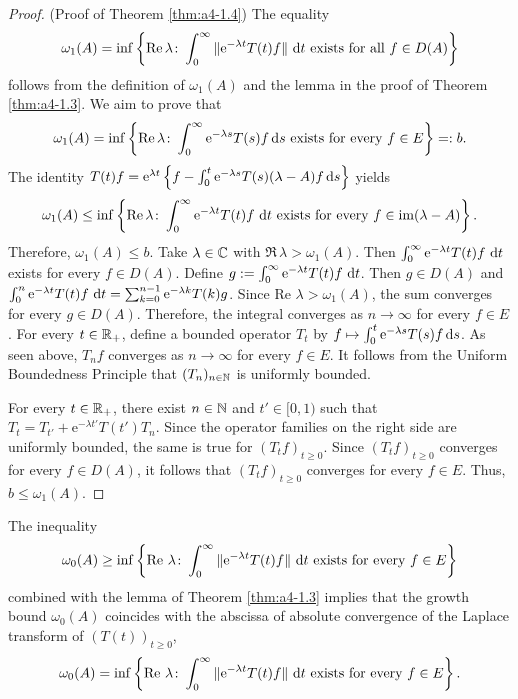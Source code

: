 \begin{proof}(Proof of Theorem \ref{thm:a4-1.4}) 
The equality 
 \[ 
 \omega_1(A) = \inf \left\{ \mathop{}\!\mathrm{Re}\,\lambda\colon\int_0^\infty \|\mathrm{e}^{-\lambda t} T(t) f \| \,\mathop{}\!\mathrm{d}{t} \text{ exists for all } f \in D(A) \right\} 
 \] 
 follows from the definition of $\omega_1(A)$ and the lemma in the proof of Theorem \ref{thm:a4-1.3}.
We aim to prove that
\[
\omega_1(A) = \inf \left\{ \mathop{}\!\mathrm{Re}\,\lambda\colon\int_0^\infty \mathrm{e}^{-\lambda s} T(s) f  \mathop{}\!\mathrm{d}{s} \text{ exists for every } f \in E \right\}=: b. 
\]
The identity
$    T(t) f = \mathrm{e}^{\lambda t} \left\{ f - \int_0^t \mathrm{e}^{-\lambda s} T(s) (\lambda - A) f  \mathop{}\!\mathrm{d}{s} \right\}
$
yields
\[
\omega_1(A) \leq \inf \left\{ \mathop{}\!\mathrm{Re}\,\lambda\colon\int_0^\infty \mathrm{e}^{-\lambda t} T(t) f \,\mathop{}\!\mathrm{d}{t} \text{ exists for every } f \in \text{im} (\lambda - A) \right\}.
\]
Therefore,
$\omega_1(A) \leq b.$
Take $\lambda \in \mathbb{C}$ with $\Re\,\lambda > \omega_1(A)$. 
Then $\int_0^\infty \mathrm{e}^{-\lambda t} T(t) f \,\mathop{}\!\mathrm{d}{t}$ exists for every $f \in D(A)$. 
Define $g := \int_0^\infty \mathrm{e}^{-\lambda t} T(t) f \,\mathop{}\!\mathrm{d}{t}$. 
Then $g \in D(A)$ and $\int_0^n \mathrm{e}^{-\lambda t} T(t) f \,\mathop{}\!\mathrm{d}{t} = \sum_{k=0}^{n-1} \mathrm{e}^{-\lambda k} T(k) g$. 
Since $\text{Re } \lambda > \omega_1(A)$, the sum converges for every $g \in D(A)$. 
Therefore, the integral converges as $n \to \infty$ for every $f \in E$.
For every $t \in \mathbb{R}_+$, define a bounded operator $T_t$ by $ f \mapsto \int_0^t \mathrm{e}^{-\lambda s} T(s) f  \mathop{}\!\mathrm{d}{s}$. 
As seen above, $T_n f$ converges as $n \to \infty$ for every $f \in E$. 
It follows from the Uniform Boundedness Principle that $(T_n)_{n \in \mathbb{N}}$ is uniformly bounded.
%


For every $t \in \mathbb{R}_+$, there exist $n \in \mathbb{N}$ and $t' \in [0,1)$ such that $T_t = T_{t'} + \mathrm{e}^{-\lambda t'} T(t') T_n$. 
Since the operator families on the right side are uniformly bounded, the same is true for $(T_t f)_{t \geq 0}$. 
Since $(T_t f)_{t \geq 0}$ converges for every $f \in D(A)$, it follows that $(T_t f)_{t \geq 0}$ converges for every $f \in E$. 
Thus, $b \leq \omega_1(A)$.
\end{proof}

%


The inequality
\[
    \omega_{0}(A) \geq \inf \left\{ \text{Re } \lambda\colon\int_0^\infty \|\mathrm{e}^{-\lambda t} T(t) f \| \,\mathop{}\!\mathrm{d}{t} 
    \text{ exists for every } f \in E \right\}
\]
combined with the lemma of Theorem \ref{thm:a4-1.3} implies that the growth bound $\omega_{0}(A)$ coincides with the abscissa of absolute convergence of the Laplace transform of $(T(t))_{t \geq 0}$, \ie
\begin{equation}\label{eq:a4-1.6}
   \omega_{0}(A) = \inf \left\{ \text{Re } \lambda\colon\int_0^\infty \|\mathrm{e}^{-\lambda t} T(t) f \| \,\mathop{}\!\mathrm{d}{t} \text{ exists for every } f \in E \right\}.
\end{equation}
%


